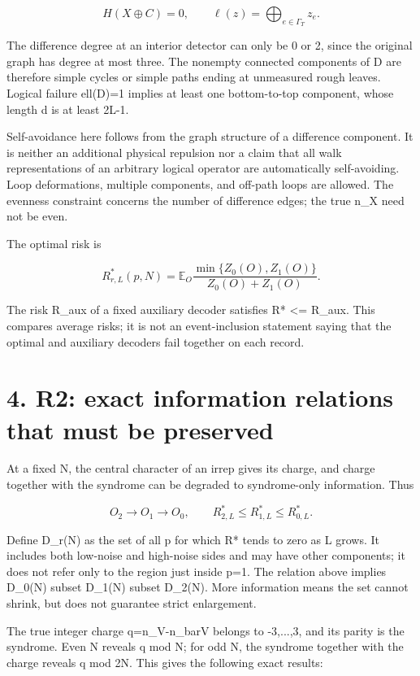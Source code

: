 \documentclass[11pt,a4paper]{article}
\begin{document}
\[
H(X\oplus C)=0,\qquad
\ell(z)=\bigoplus_{e\in\Gamma_T}z_e.
\]

The difference degree at an interior detector can only be 0 or 2, since the original graph has degree at most three. The nonempty connected components of D are therefore simple cycles or simple paths ending at unmeasured rough leaves. Logical failure ell(D)=1 implies at least one bottom-to-top component, whose length d is at least 2L-1.

Self-avoidance here follows from the graph structure of a difference component. It is neither an additional physical repulsion nor a claim that all walk representations of an arbitrary logical operator are automatically self-avoiding. Loop deformations, multiple components, and off-path loops are allowed. The evenness constraint concerns the number of difference edges; the true n\_X need not be even.

The optimal risk is

\[
R^*_{r,L}(p,N)=\mathbb E_O\frac{\min\{Z_0(O),Z_1(O)\}}{Z_0(O)+Z_1(O)}.
\]

The risk R\_aux of a fixed auxiliary decoder satisfies R* <= R\_aux. This compares average risks; it is not an event-inclusion statement saying that the optimal and auxiliary decoders fail together on each record.

\section*{4. R2: exact information relations that must be preserved}

At a fixed N, the central character of an irrep gives its charge, and charge together with the syndrome can be degraded to syndrome-only information. Thus

\[
O_2\longrightarrow O_1\longrightarrow O_0,
\qquad R^*_{2,L}\le R^*_{1,L}\le R^*_{0,L}.
\]

Define D\_r(N) as the set of all p for which R* tends to zero as L grows. It includes both low-noise and high-noise sides and may have other components; it does not refer only to the region just inside p=1. The relation above implies D\_0(N) subset D\_1(N) subset D\_2(N). More information means the set cannot shrink, but does not guarantee strict enlargement.

The true integer charge q=n\_V-n\_barV belongs to -3,...,3, and its parity is the syndrome. Even N reveals q mod N; for odd N, the syndrome together with the charge reveals q mod 2N. This gives the following exact results:
\end{document}
